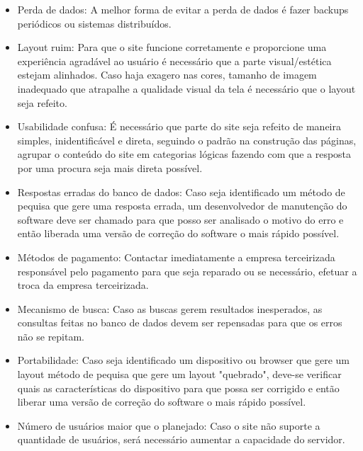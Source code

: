 \documentclass[12pt]{article}
\begin{document}
       \begin{itemize}
       \item Perda de dados: A melhor forma de evitar a perda de dados é fazer backups periódicos ou sistemas distribuídos.
       
       \item  Layout ruim: Para que o site funcione corretamente e proporcione uma experiência agradável ao usuário é necessário que a parte visual/estética estejam alinhados. Caso haja exagero nas cores, tamanho de imagem inadequado que atrapalhe a qualidade visual da tela é necessário que o layout seja refeito.
       
        \item Usabilidade confusa: É necessário que parte do site seja refeito de maneira simples, inidentificável e direta, seguindo o padrão na construção das páginas, agrupar o conteúdo do site em categorias lógicas fazendo com que a resposta por uma procura seja mais direta possível.
        
        \item Respostas erradas do banco de dados: Caso seja identificado um método de pequisa que gere uma resposta errada, um desenvolvedor de manutenção do software deve ser chamado para que posso ser analisado o motivo do erro e então liberada uma versão de correção do software o mais rápido possível.
        
        \item Métodos de pagamento: Contactar imediatamente a empresa terceirizada responsável pelo pagamento para que seja reparado ou se necessário, efetuar a troca da empresa terceirizada.
       
        \item Mecanismo de busca: Caso as buscas gerem resultados inesperados, as consultas feitas no banco de dados devem ser repensadas para que os erros não se repitam.
        
        \item Portabilidade: Caso seja identificado um dispositivo ou browser que gere um layout     método de pequisa que gere um layout "quebrado", deve-se verificar quais as características do dispositivo para que possa ser corrigido e então liberar uma versão de correção do software o mais rápido possível.
        
        \item Número de usuários maior  que o planejado: Caso o site não suporte a quantidade de usuários, será necessário aumentar a capacidade do servidor.
        

\end{itemize}
\end{document}
